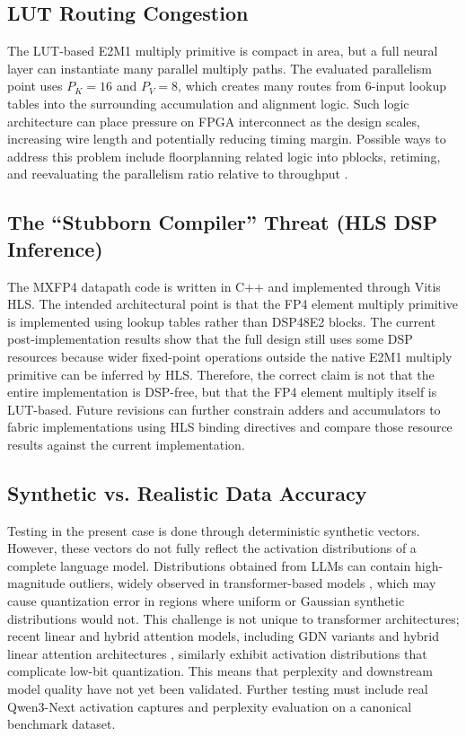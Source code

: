 \documentclass[conference]{IEEEtran}
\begin{document}
\subsection{LUT Routing Congestion}
The LUT-based E2M1 multiply primitive is compact in area, but a full neural layer can instantiate many parallel multiply paths. The evaluated parallelism point uses $P_K=16$ and $P_V=8$, which creates many routes from 6-input lookup tables into the surrounding accumulation and alignment logic. Such logic architecture can place pressure on FPGA interconnect as the design scales, increasing wire length and potentially reducing timing margin. Possible ways to address this problem include floorplanning related logic into pblocks, retiming, and reevaluating the parallelism ratio relative to throughput \cite{b10}.

\subsection{The ``Stubborn Compiler'' Threat (HLS DSP Inference)}
The MXFP4 datapath code is written in C++ and implemented through Vitis HLS. The intended architectural point is that the FP4 element multiply primitive is implemented using lookup tables rather than DSP48E2 blocks. The current post-implementation results show that the full design still uses some DSP resources because wider fixed-point operations outside the native E2M1 multiply primitive can be inferred by HLS. Therefore, the correct claim is not that the entire implementation is DSP-free, but that the FP4 element multiply itself is LUT-based. Future revisions can further constrain adders and accumulators to fabric implementations using HLS binding directives and compare those resource results against the current implementation.

\subsection{Synthetic vs. Realistic Data Accuracy}
Testing in the present case is done through deterministic synthetic vectors. However, these vectors do not fully reflect the activation distributions of a complete language model. Distributions obtained from LLMs can contain high-magnitude outliers, widely observed in transformer-based models \cite{b2}, which may cause quantization error in regions where uniform or Gaussian synthetic distributions would not. This challenge is not unique to transformer architectures; recent linear and hybrid attention models, including GDN variants \cite{b3} and hybrid linear attention architectures \cite{b8}, similarly exhibit activation distributions that complicate low-bit quantization. This means that perplexity and downstream model quality have not yet been validated. Further testing must include real Qwen3-Next activation captures and perplexity evaluation on a canonical benchmark dataset.
\end{document}
